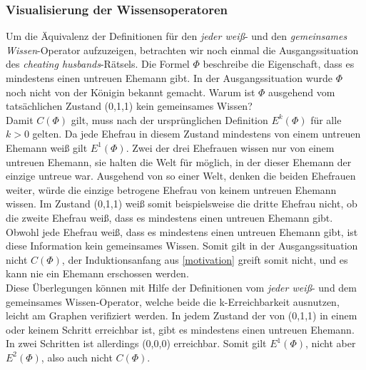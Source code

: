 \subsubsection{Visualisierung der Wissensoperatoren}
Um die Äquivalenz der Definitionen für den \textit{jeder weiß}- und den \textit{gemeinsames Wissen}-Operator aufzuzeigen, betrachten wir noch einmal die Ausgangssituation des \textit{cheating husbands}-Rätsels. 
Die Formel $\Phi$ beschreibe die Eigenschaft, dass es mindestens einen untreuen Ehemann gibt.
In der Ausgangssituation wurde $\Phi$ noch nicht von der Königin bekannt gemacht.
Warum ist $\Phi$ ausgehend vom tatsächlichen Zustand (0,1,1) kein gemeinsames Wissen?\\
Damit $C(\Phi)$ gilt, muss nach der ursprünglichen Definition $E^k(\Phi)$ für alle $k>0$ gelten.
Da jede Ehefrau in diesem Zustand mindestens von einem untreuen Ehemann weiß gilt $E^1(\Phi)$.
Zwei der drei Ehefrauen wissen nur von einem untreuen Ehemann, sie halten die Welt für möglich, in der dieser Ehemann der einzige untreue war.
Ausgehend von so einer Welt, denken die beiden Ehefrauen weiter, würde die einzige betrogene Ehefrau von keinem untreuen Ehemann wissen.
Im Zustand (0,1,1) weiß somit beispielsweise die dritte Ehefrau nicht, ob die zweite Ehefrau weiß, dass es mindestens einen untreuen Ehemann gibt.
Obwohl jede Ehefrau weiß, dass es mindestens einen untreuen Ehemann gibt, ist diese Information kein gemeinsames Wissen.
Somit gilt in der Ausgangssituation nicht $C(\Phi)$, der Induktionsanfang aus \ref{motivation} greift somit nicht, und es kann nie ein Ehemann erschossen werden.\\

Diese Überlegungen können mit Hilfe der Definitionen vom \textit{jeder weiß}- und dem gemeinsames Wissen-Operator, welche beide die k-Erreichbarkeit ausnutzen, leicht am Graphen verifiziert werden.
In jedem Zustand der von (0,1,1) in einem oder keinem Schritt erreichbar ist, gibt es mindestens einen untreuen Ehemann. In zwei Schritten ist allerdings (0,0,0) erreichbar. Somit gilt $E^1(\Phi)$, nicht aber $E^2(\Phi)$, also auch nicht $C(\Phi)$.\medskip

